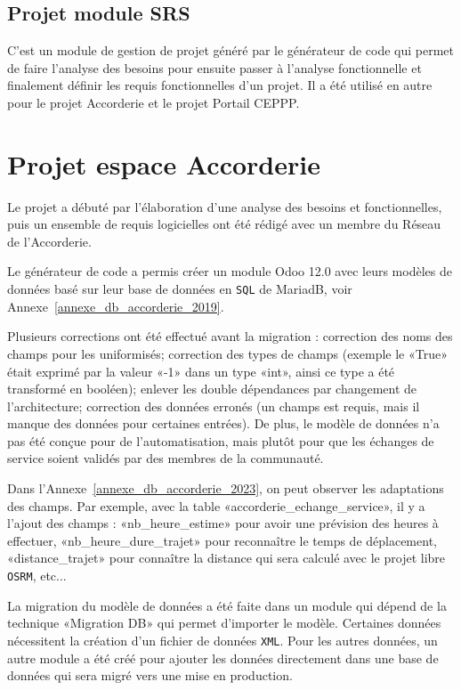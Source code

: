 \subsection{Projet module SRS}

C’est un module de gestion de projet généré par le générateur de code qui permet de faire l’analyse des besoins pour ensuite passer à l’analyse fonctionnelle et finalement définir les requis fonctionnelles d’un projet. Il a été utilisé en autre pour le projet Accorderie et le projet Portail CEPPP.

\section{Projet espace Accorderie}

Le projet a débuté par l'élaboration d'une analyse des besoins et fonctionnelles, puis un ensemble de requis logicielles ont été rédigé avec un membre du Réseau de l'Accorderie. %

Le générateur de code a permis créer un module Odoo 12.0 avec leurs modèles de données basé sur leur base de données en \texttt{SQL} de MariadB, voir Annexe~\ref{annexe_db_accorderie_2019}.

Plusieurs corrections ont été effectué avant la migration : correction des noms des champs pour les uniformisés; correction des types de champs (exemple le «True» était exprimé par la valeur «-1» dans un type «int», ainsi ce type a été transformé en booléen); enlever les double dépendances par changement de l’architecture; correction des données erronés (un champs est requis, mais il manque des données pour certaines entrées). De plus, le modèle de données n’a pas été conçue pour de l’automatisation, mais plutôt pour que les échanges de service soient validés par des membres de la communauté.

Dans l'Annexe~\ref{annexe_db_accorderie_2023}, on peut observer les adaptations des champs. Par exemple, avec la table «accorderie\_echange\_service», il y a l'ajout des champs : «nb\_heure\_estime» pour avoir une prévision des heures à effectuer, «nb\_heure\_dure\_trajet» pour reconnaître le temps de déplacement, «distance\_trajet» pour connaître la distance qui sera calculé avec le projet libre \texttt{OSRM}, etc...

La migration du modèle de données a été faite dans un module qui dépend de la technique «Migration DB» qui permet d'importer le modèle. Certaines données nécessitent la création d’un fichier de données \texttt{XML}. Pour les autres données, un autre module a été créé pour ajouter les données directement dans une base de données qui sera migré vers une mise en production.

